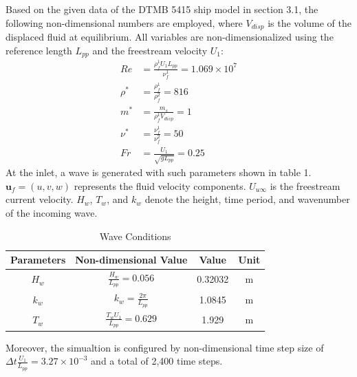 \documentclass[12pt]{article} %
\begin{document}
Based on the given data of the DTMB 5415 ship model in section 3.1, the following non-dimensional numbers are employed, where \( V_{disp} \) is the volume of the displaced fluid at equilibrium. All variables are non-dimensionalized using the reference length \( L_{pp} \) and the freestream velocity \( U_1 \):
\begin{align*}
    Re &= \frac{\rho_f^1 U_1 L_{pp}}{\nu_f^1} = 1.069 \times 10^7 \\
    \rho^* &= \frac{\rho_f^1}{\rho_f^2} = 816 \\
    m^* &= \frac{m_s}{\rho_f^1 V_{disp}} = 1 \\
    \nu^* &= \frac{\nu_f^1}{\nu_f^2} = 50 \\
    Fr &= \frac{U_1}{\sqrt{g L_{pp}}} = 0.25
\end{align*}
At the inlet, a wave is generated with such parameters shown in table 1. \(\mathbf{u}_f = (u, v, w)\) represents the fluid velocity components. \(U_{u\infty}\) is the 
freestream current velocity. \(H_w\), \(T_w\), and \(k_w\) denote the height, time period, and 
wavenumber of the incoming wave.
\begin{table}[ht]
    \caption{Wave Conditions}
    \centering
    \begin{tabular}{|c|c|c|c|}
        \hline
        Parameters & Non-dimensional Value &Value & Unit\\
        \hline   
        $H_w$ & \(\frac{H_w}{L_{pp}} = 0.056\) &0.32032 & m \\
        $k_w$ & \(k_w = \frac{2\pi}{L_{pp}}\) &1.0845 & m\\
        $T_w$ & \(\frac{T_w U_1}{L_{pp}} = 0.629\) &1.929 & m \\
        \hline
    \end{tabular}
\end{table}

Moreover, the simualtion is configured by non-dimensional time step size of \(\Delta t \frac{U_1}{L_{pp}} = 3.27 \times 10^{-3}\) and a total of 2,400 time steps.
\end{document}
